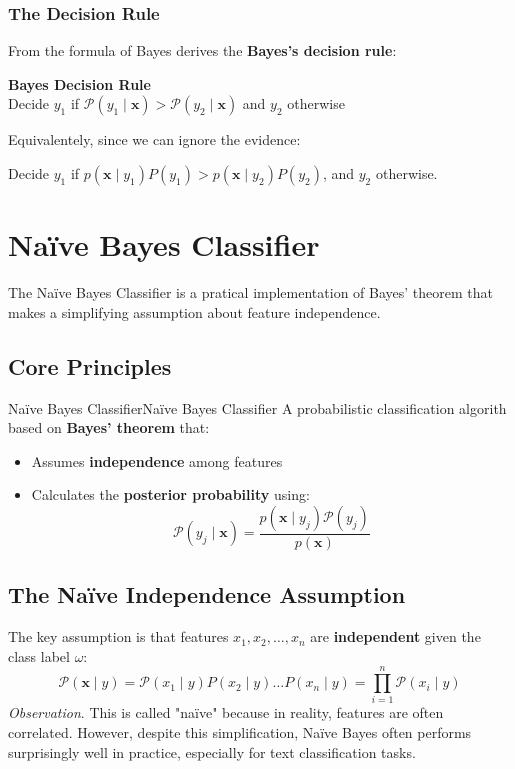 \documentclass[a4paper]{article}
\theoremstyle{definition}
\begin{document}
\subsubsection{The Decision Rule}
From the formula of Bayes derives the \textbf{Bayes's decision rule}:
\begin{tcolorbox}[
    colback=orange!15!white,
    colframe=orange!15!white,
    boxrule=0pt,
    arc=0pt,
    halign=center
]
    \textbf{Bayes Decision Rule}\\[0.6em]
    Decide $y_1$ if \( \mathcal{P}(y_1 \mid \mathbf{x}) > \mathcal{P}(y_2 \mid \mathbf{x}) \) and $y_2$ otherwise
\end{tcolorbox}
Equivalentely, since we can ignore the evidence:
\begin{tcolorbox}[
    colback=blue!15!white,
    colframe=blue!15!white,
    boxrule=0pt,
    arc=0pt,
    halign=center
]
    Decide \( y_1 \) if \( p(\mathbf{x} \mid y_1)P(y_1) > p(\mathbf{x} \mid y_2)P(y_2) \), and \( y_2 \) otherwise.
\end{tcolorbox}
\section{Naïve Bayes Classifier}
The Naïve Bayes Classifier is a pratical implementation of Bayes' theorem that makes a simplifying 
assumption about feature independence.
\subsection{Core Principles}
\begin{definition}{Naïve Bayes Classifier}{Naïve Bayes Classifier}
A probabilistic classification algorith based on \textbf{Bayes' theorem} that:
\begin{itemize}
    \item Assumes \textbf{independence} among features 
    \item Calculates the \textbf{posterior probability} using:
    \[
      \mathcal{P}(y_j \mid \mathbf{x}) = \frac{p(\mathbf{x} \mid y_j)\mathcal{P}(y_j)}{p(\mathbf{x})}
    \]
\end{itemize} 
\end{definition}
\subsection{The Naïve Independence Assumption}
The key assumption is that features \( x_1,x_2, \ldots, x_n \) are \textbf{independent} given the class label \( \omega \):
\[
  \mathcal{P}(\mathbf{x} \mid y) = \mathcal{P}(x_1 \mid y) P(x_2 \mid y) \ldots P(x_n \mid y) = \prod_{i = 1}^{n} \mathcal{P}(x_i \mid y)
\]
\textit{Observation}. This is called "naïve" because in reality, features are often correlated. However, despite this simplification,
Naïve Bayes often performs surprisingly well in practice, especially for text classification tasks.
\end{document}

